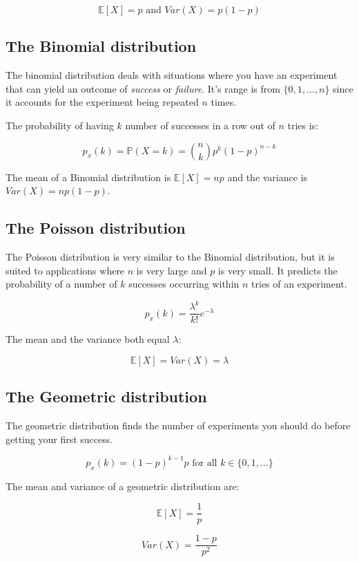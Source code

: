 \begin{dmath*}
	{\mathbb{E}[X] = p} \textrm{ and } {Var(X) = p(1-p)}
\end{dmath*}

\subsection{The Binomial distribution}

The binomial distribution deals with situations where you have an experiment
that can yield an outcome of {\it success} or {\it failure}. It's range is from
$\{0, 1, \dots, n\}$ since it accounts for the experiment being repeated $n$
times.

The probability of having $k$ number of successes in a row out of $n$ tries is:

\begin{dmath*}
	{p_x(k) = \mathbb{P}(X = k) = {n \choose k}p^k(1-p)^{n-k}}
\end{dmath*}

The mean of a Binomial distribution is $\mathbb{E}[X] = np$ and the variance is
$Var(X) = np(1-p)$.

\subsection{The Poisson distribution}

The Poisson distribution is very similar to the Binomial distribution, but it is
suited to applications where $n$ is very large and $p$ is very small. It
predicts the probability of a number of $k$ successes occurring within $n$ tries
of an experiment.

\begin{dmath*}
	p_x(k) = \frac{\lambda^k}{k!}e^{-\lambda}
\end{dmath*}

The mean and the variance both equal $\lambda$:

\begin{dmath*}
	{\mathbb{E}[X] = Var(X) = \lambda}
\end{dmath*}

\subsection{The Geometric distribution}

The geometric distribution finds the number of experiments you should do before
getting your first success.

\begin{dmath*}
	p_x(k) = (1-p)^{k-1}p \textrm{ for all $k \in \{0, 1, \dots\}$}
\end{dmath*}

The mean and variance of a geometric distribution are:

\begin{dmath*}
	\mathbb{E}[X] = \frac{1}{p}
\end{dmath*}

\begin{dmath*}
	Var(X) = \frac{1-p}{p^2}
\end{dmath*}